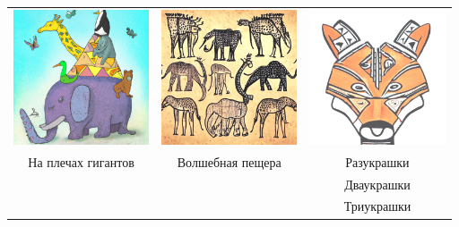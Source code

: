 \documentclass[a5paper,11pt]{memoir}
\begin{document}
\begin{table}[h]
\begin{tabular}{ccc}
\includegraphics[height=4cm]{images/magic-pyramid} & \includegraphics[height=4cm]{images/cave-stories} & \includegraphics[height=4cm]{images/razukrashki.jpg}             \\
 На плечах гигантов       &  Волшебная пещера    &     Разукрашки \\    
        &      &     Дваукрашки \\
        &      &     Триукрашки \\
\end{tabular}
\end{table}
\end{document}
